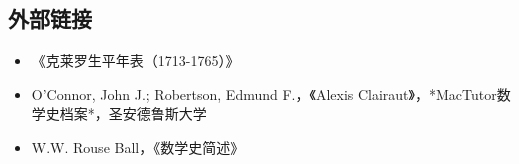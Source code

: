 \subsection{外部链接}
\begin{itemize}
\item 《克莱罗生平年表（1713-1765）》  
\item O'Connor, John J.; Robertson, Edmund F.，《Alexis Clairaut》，*MacTutor数学史档案*，圣安德鲁斯大学  
\item W.W. Rouse Ball，《数学史简述》
\end{itemize}